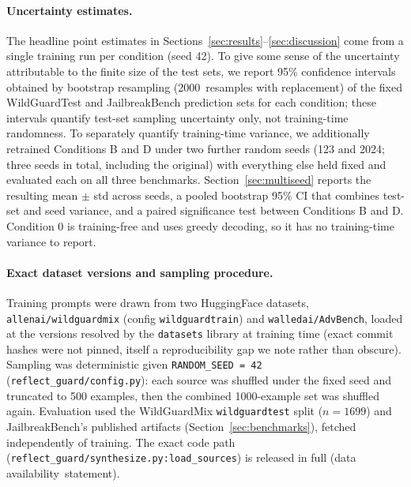 \documentclass[superintelligence,article,accept,moreauthors]{Definitions/mdpi}
\renewcommand{\hl}[1]{#1}
\begin{document}
\paragraph{\hl{Uncertainty estimates.} %
} The headline point estimates in Sections~\ref{sec:results}--\ref{sec:discussion} come from a single training run per condition (seed 42). To give some sense of the uncertainty attributable to the finite size of the test sets, we report 95\% confidence intervals obtained by bootstrap resampling (2000~resamples with replacement) of the fixed WildGuardTest and JailbreakBench prediction sets for each condition; these intervals quantify test-set sampling uncertainty only, not training-time randomness. To separately quantify training-time variance, we additionally retrained Conditions B and D under two further random seeds (123 and 2024; three seeds in total, including the original) with everything else held fixed and evaluated each on all three benchmarks. Section~\ref{sec:multiseed} reports the resulting mean $\pm$ std across seeds, a pooled bootstrap 95\% CI that combines test-set and seed variance, and a paired significance test between Conditions B and D. Condition 0 is training-free and uses greedy decoding, so it has no training-time variance to report.

\paragraph{\hl{Exact dataset versions and sampling procedure.}} Training prompts were drawn from two HuggingFace datasets, \texttt{allenai/wildguardmix} (config \texttt{wildguardtrain}) and \texttt{walledai/AdvBench}, loaded at the versions resolved by the \texttt{datasets} library at training time (exact commit hashes were not pinned, itself a reproducibility gap we note rather than obscure). Sampling was deterministic given \texttt{RANDOM\_SEED = 42} (\texttt{reflect\_guard/config.py}): each source was shuffled under the fixed seed and truncated to 500 examples, then the combined 1000-example set was shuffled again. Evaluation used the WildGuardMix \texttt{wildguardtest} split ($n=1699$) and JailbreakBench's published artifacts (Section~\ref{sec:benchmarks}), fetched independently of training. The exact code path (\texttt{reflect\_guard/synthesize.py:load\_sources}) is released in full (data \mbox{availability statement}).
\end{document}
